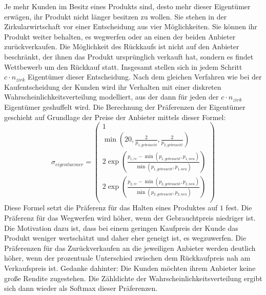 Je mehr Kunden im Besitz eines Produkts sind, desto mehr dieser Eigentümer erwägen, ihr Produkt nicht länger besitzen zu wollen.
Sie stehen in der Zirkularwirtschaft vor einer Entscheidung aus vier Möglichkeiten.
Sie können ihr Produkt weiter behalten, es wegwerfen oder an einen der beiden Anbieter zurückverkaufen.
Die Möglichkeit des Rückkaufs ist nicht auf den Anbieter beschränkt, der ihnen das Produkt ursprünglich verkauft hat, sondern es findet Wettbewerb um den Rückkauf statt.
Insgesamt stellen sich in jedem Schritt $c \cdot n_{zirk}$ Eigentümer dieser Entscheidung.
Nach dem gleichen Verfahren wie bei der Kaufentscheidung der Kunden wird ihr Verhalten mit einer diskreten Wahrscheinlichkeitsverteilung modelliert, aus der dann für jeden der $c \cdot n_{zirk}$ Eigentümer geshuffelt wird.
Die Berechnung der Präferenzen der Eigentümer geschieht auf Grundlage der Preise der Anbieter mittels dieser Formel:
\begin{equation}
	\sigma_{eigentuemer}=
	\begin{pmatrix}
		1\\
		\min \left(20, \frac{2}{p_{1, gebraucht}},  \frac{2}{p_{2, gebraucht}}\right)\\
		2 \exp{\left(\frac{p_{1, re} - \min{(p_{1, gebraucht}, p_{1, neu})}}{\min{(p_{1, gebraucht}, p_{1, neu})}}\right)}\\
		2 \exp{\left(\frac{p_{2, re} - \min{(p_{2, gebraucht}, p_{2, neu})}}{\min{(p_{2, gebraucht}, p_{2, neu})}}\right)}\\
	\end{pmatrix}
\end{equation}
Diese Formel setzt die Präferenz für das Halten eines Produktes auf $1$ fest.
Die Präferenz für das Wegwerfen wird höher, wenn der Gebrauchtpreis niedriger ist.
Die Motivation dazu ist, dass bei einem geringen Kaufpreis der Kunde das Produkt weniger wertschätzt und daher eher geneigt ist, es wegzuwerfen.
Die Präferenzen für das Zurückverkaufen an die jeweiligen Anbieter werden deutlich höher, wenn der prozentuale Unterschied zwischen dem Rückkaufpreis nah am Verkaufspreis ist.
Gedanke dahinter: Die Kunden möchten ihrem Anbieter keine große Rendite zugestehen.
Die Zähldichte der Wahrscheinlichkeitsverteilung ergibt sich dann wieder als Softmax dieser Präferenzen.

